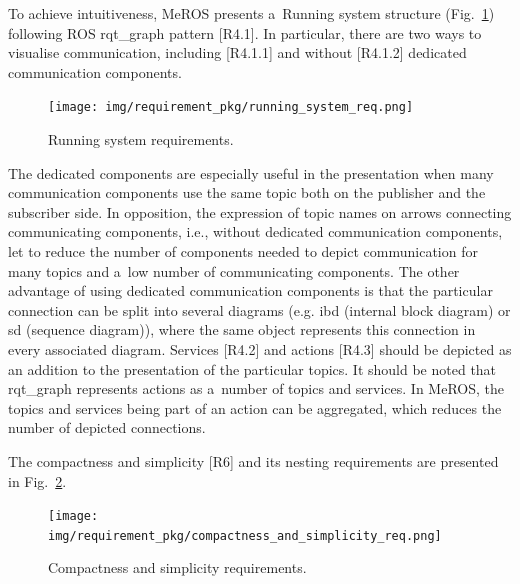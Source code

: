 \documentclass[11pt,oneside,a4paper]{report}
\begin{document}
	
	To achieve intuitiveness, MeROS presents a~Running system structure (Fig.~\ref{fig:running_system_req}) following ROS rqt\_graph pattern [R4.1]. In particular, there are two ways to visualise communication, including [R4.1.1] and without [R4.1.2]
	dedicated communication components.
	\begin{figure}[H]
		\centering
		\begin{center}
			{\texttt{[image: img/requirement\_pkg/running\_system\_req.png]}}
		\end{center}
		\caption{Running system requirements.} 
		\label{fig:running_system_req}
	\end{figure}
	 The dedicated components are especially useful in the presentation when many communication components use the same topic both on the publisher and the subscriber side. In opposition, the expression of topic names on arrows connecting communicating components, i.e., without dedicated communication components, let to reduce the number of components needed to depict communication for many topics and a~low number of communicating components. The other advantage of using dedicated communication components is that the particular connection can be split into several diagrams (e.g. ibd (internal block diagram) or sd (sequence diagram)), where the same object represents this connection in every associated diagram. Services [R4.2] and actions [R4.3] should be depicted as an addition to the presentation of the particular topics. It should be noted that rqt\_graph represents actions as a~number of topics and services. In MeROS, the topics and services being part of an action can be aggregated, which reduces the number of depicted connections.
		
			
	The compactness and simplicity [R6] and its nesting requirements are presented in Fig.~\ref{fig:compactness_and_simplicity_req}. 
	
	\begin{figure}[H]
		\centering
		\begin{center}
			{\texttt{[image: img/requirement\_pkg/compactness\_and\_simplicity\_req.png]}}
		\end{center}
		\caption{Compactness and simplicity requirements.} 
		\label{fig:compactness_and_simplicity_req}
	\end{figure}
	
\end{document}
